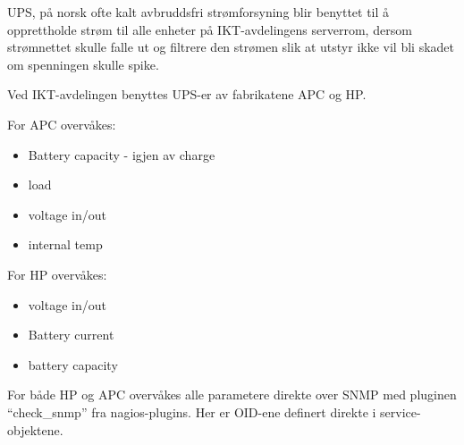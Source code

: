 UPS, på norsk ofte kalt avbruddsfri strømforsyning blir benyttet til å opprettholde strøm til alle enheter på IKT-avdelingens serverrom, dersom strømnettet skulle falle ut og filtrere den strømen slik at utstyr ikke vil bli skadet om spenningen skulle spike.

Ved IKT-avdelingen benyttes UPS-er av fabrikatene APC og HP.

For APC overvåkes:
\begin{itemize}
 	\item Battery capacity - igjen av charge
	\item load
	\item voltage in/out
	\item internal temp
\end{itemize}

For HP overvåkes:
\begin{itemize}
	\item voltage in/out
	\item Battery current
	\item battery capacity
\end{itemize}

For både HP og APC overvåkes alle parametere direkte over SNMP med pluginen “check\_snmp” fra nagios-plugins. Her er OID-ene definert direkte i service-objektene.
